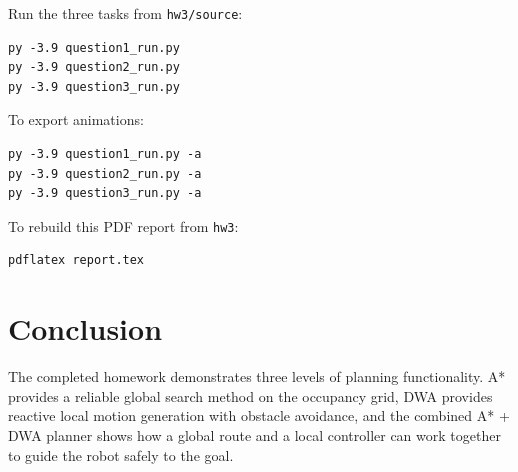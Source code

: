 \documentclass[11pt,a4paper]{article}
\begin{document}
Run the three tasks from \texttt{hw3/source}:

\begin{verbatim}
py -3.9 question1_run.py
py -3.9 question2_run.py
py -3.9 question3_run.py
\end{verbatim}

To export animations:

\begin{verbatim}
py -3.9 question1_run.py -a
py -3.9 question2_run.py -a
py -3.9 question3_run.py -a
\end{verbatim}

To rebuild this PDF report from \texttt{hw3}:

\begin{verbatim}
pdflatex report.tex
\end{verbatim}

\section{Conclusion}

The completed homework demonstrates three levels of planning functionality. A* provides a reliable global search method on the occupancy grid, DWA provides reactive local motion generation with obstacle avoidance, and the combined A* + DWA planner shows how a global route and a local controller can work together to guide the robot safely to the goal.
\end{document}

